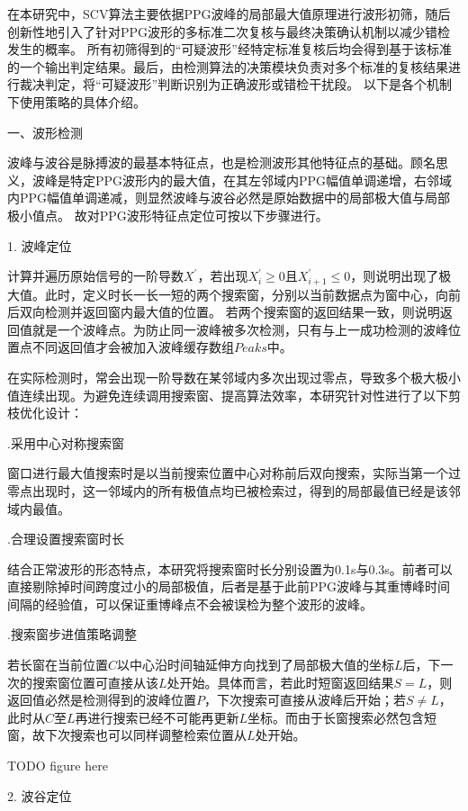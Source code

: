 在本研究中，SCV算法主要依据PPG波峰的局部最大值原理进行波形初筛，随后创新性地引入了针对PPG波形的多标准二次复核与最终决策确认机制以减少错检发生的概率。
所有初筛得到的“可疑波形”经特定标准复核后均会得到基于该标准的一个输出判定结果。最后，由检测算法的决策模块负责对多个标准的复核结果进行裁决判定，将“可疑波形”判断识别为正确波形或错检干扰段。
以下是各个机制下使用策略的具体介绍。

一、波形检测

波峰与波谷是脉搏波的最基本特征点，也是检测波形其他特征点的基础。顾名思义，波峰是特定PPG波形内的最大值，在其左邻域内PPG幅值单调递增，右邻域内PPG幅值单调递减，则显然波峰与波谷必然是原始数据中的局部极大值与局部极小值点。
故对PPG波形特征点定位可按以下步骤进行。

1. 波峰定位

计算并遍历原始信号的一阶导数$X^{'}$，若出现$X_i^{'}\ge 0$且$X_{i+1}^{'}\le 0$，则说明出现了极大值。此时，定义时长一长一短的两个搜索窗，分别以当前数据点为窗中心，向前后双向检测并返回窗内最大值的位置。
若两个搜索窗的返回结果一致，则说明返回值就是一个波峰点。为防止同一波峰被多次检测，只有与上一成功检测的波峰位置点不同返回值才会被加入波峰缓存数组$Peaks$中。

在实际检测时，常会出现一阶导数在某邻域内多次出现过零点，导致多个极大极小值连续出现。为避免连续调用搜索窗、提高算法效率，本研究针对性进行了以下剪枝优化设计：

.采用中心对称搜索窗

窗口进行最大值搜索时是以当前搜索位置中心对称前后双向搜索，实际当第一个过零点出现时，这一邻域内的所有极值点均已被检索过，得到的局部最值已经是该邻域内最值。

.合理设置搜索窗时长

结合正常波形的形态特点，本研究将搜索窗时长分别设置为0.1s与0.3s。前者可以直接剔除掉时间跨度过小的局部极值，后者是基于此前PPG波峰与其重博峰时间间隔的经验值，可以保证重博峰点不会被误检为整个波形的波峰。

.搜索窗步进值策略调整

若长窗在当前位置$C$以中心沿时间轴延伸方向找到了局部极大值的坐标$L$后，下一次的搜索窗位置可直接从该$L$处开始。具体而言，若此时短窗返回结果$S=L$，则返回值必然是检测得到的波峰位置$P$，下次搜索可直接从波峰后开始；若$S\ne L$，
此时从$C$至$L$再进行搜索已经不可能再更新$L$坐标。而由于长窗搜索必然包含短窗，故下次搜索也可以同样调整检索位置从$L$处开始。

TODO 
figure here

2. 波谷定位

